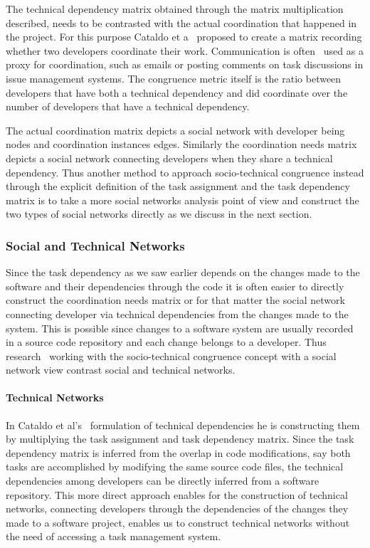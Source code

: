 The technical dependency matrix obtained through the matrix multiplication described, needs to be contrasted with the actual coordination that happened in the project.
For this purpose Cataldo et a~\cite{cataldo:cscw:2006} proposed to create a matrix recording whether two developers coordinate their work.
Communication is often~\cite{cataldo:cscw:2006,kwan:tse:2011,valetto:msr:2007,ducheneaut:cscw:2005,ehrlich:stc:2008,wolf:icse:2009} used as a proxy for coordination, such as emails or posting comments on task discussions in issue management systems.
The congruence metric itself is the ratio between developers that have both a technical dependency and did coordinate over the number of developers that have a technical dependency.

The actual coordination matrix depicts a social network with developer being nodes and coordination instances edges.
Similarly the coordination needs matrix depicts a social network connecting developers when they share a technical dependency.
Thus another method to approach socio-technical congruence instead through the explicit definition of the task assignment and the task dependency matrix is to take a more social networks analysis point of view and construct the two types of social networks directly as we discuss in the next section.

\subsubsection{Social and Technical Networks}
Since the task dependency as we saw earlier depends on the changes made to the software and their dependencies through the code it is often easier to directly construct the coordination needs matrix or for that matter the social network connecting developer via technical dependencies from the changes made to the system.
This is possible since changes to a software system are usually recorded in a source code repository and each change belongs to a developer.
Thus research~\cite{cataldo:cscw:2006,kwan:tse:2011,valetto:msr:2007,ducheneaut:cscw:2005,ehrlich:stc:2008} working with the socio-technical congruence concept with a social network view contrast social and technical networks.

\paragraph{Technical Networks}
In Cataldo et al's~\cite{cataldo:cscw:2006} formulation of technical dependencies he is constructing them by multiplying the task assignment and task dependency matrix.
Since the task dependency matrix is inferred from the overlap in code modifications, say both tasks are accomplished by modifying the same source code files, the technical dependencies among developers can be directly inferred from a software repository.
This more direct approach enables for the construction of technical networks, connecting developers through the dependencies of the changes they made to a software project, enables us to construct technical networks without the need of accessing a task management system.


